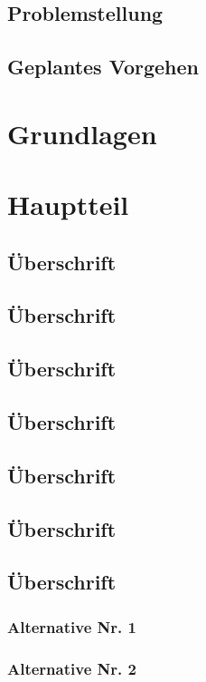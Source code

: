 \documentclass[12px, a4paper]{article}
\begin{document}
\begin{spacing}{1.5}
\subsection{Problemstellung}
\blindtext

\subsection{Geplantes Vorgehen}
\blindtext
\newpage
\section{Grundlagen}
\newpage
\section{Hauptteil}

\subsection{Überschrift}
\blindtext
\subsection{Überschrift}
\blindtext
\subsection{Überschrift}
\blindtext
\subsection{Überschrift}
\blindtext
\subsection{Überschrift}
\blindtext
\subsection{Überschrift}
\blindtext
\subsection{Überschrift}
\blindtext
\subsubsection{Alternative Nr. 1}
\blindtext
\subsubsection{Alternative Nr. 2}
\blindtext

\end{spacing}
\end{document}
